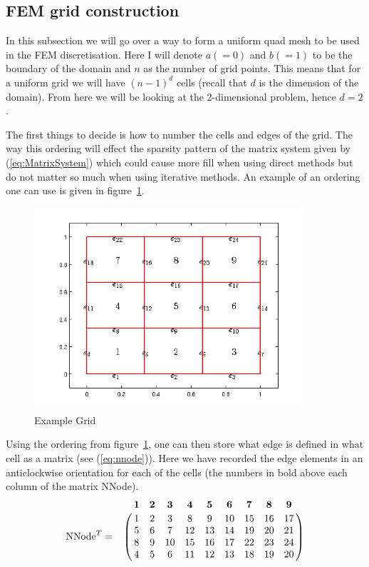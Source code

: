 \documentclass[14pt]{extarticle}
\numberwithin{equation}{section}    %
\begin{document}

\subsection{FEM grid construction}

In this subsection we will go over a way to form a uniform quad mesh to  be used in the FEM discretisation. Here I will denote $a(=0)$ and $b(=1)$ to be the  boundary of the domain and $n$ as the number of grid points. This means that for a uniform grid we will have $(n-1)^d$ cells (recall that $d$ is the dimension of the domain). From here we will be looking at the 2-dimensional problem, hence $d=2$.

The first things to decide is how to number the cells and edges of the grid. The way this ordering will effect the sparsity pattern of the matrix system given by (\ref{eq:MatrixSystem}) which could cause more fill when using direct methods but do not matter so much when using iterative methods. An example of an ordering one can use is given in figure~\ref{fig:grid}.
\begin{figure}[h!]
\centering
\includegraphics[width=10cm]{GridFigure/3x3Grid}
\caption{Example Grid}
\label{fig:grid}
\end{figure}

Using the ordering from figure~\ref{fig:grid}, one can then store what edge is defined in what cell as a matrix (see (\ref{eq:nnode})). Here we have recorded the edge elements in an anticlockwise orientation for each of the cells (the numbers in bold above each column of the matrix NNode).
\begin{equation} \label{eq:nnode}
\mbox{NNode}^T = \bordermatrix{
 ~&\bf{1}  &  \bf{ 2} &    \bf{3} &   \bf{4}  &   \bf{5} &   \bf{6} &   \bf{7} &   \bf{8} &   \bf{9}\cr
 ~&1  &   2 &    3 &    8  &   9 &   10 &   15 &   16 &   17\cr
    ~& 5   &  6 &    7    &12&    13    &14&    19    &20&    21\cr
    ~& 8   &  9   & 10 &   15 &   16 &   17 &   22 &   23 &   24\cr
     ~&4  &   5     &6&    11    &12&    13    &18&    19    &20\cr
}
\end{equation}
\end{document}
